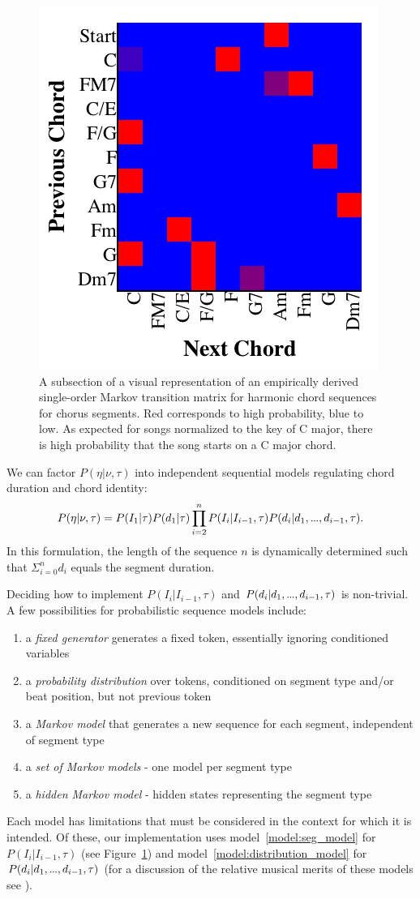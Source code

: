 \documentclass[letterpaper]{article}
\newcommand\mydots{\hbox to .75em{.\hss.\hss.}}
\begin{document}
\begin{figure}[t]
	\centering
	\includegraphics[width=.6\linewidth]{harmony}
	\caption{\label{fig:harmony} A subsection of a visual representation of an empirically derived single-order Markov transition matrix for harmonic chord sequences for chorus segments. Red corresponds to high probability, blue to low. As expected for songs normalized to the key of C major, there is high probability that the song starts on a C major chord. }
\end{figure}

We can factor $P(\eta|\nu,\tau)$ into independent sequential models regulating chord duration and chord identity:
\small
\[ P(\eta|\nu,\tau) = P(I_1|\tau) P(d_1|\tau) \prod_{i=2}^n P(I_i|I_{i-1},\tau) P(d_i | d_1,\mydots,d_{i-1},\tau). \]
\normalsize
\noindent  In this formulation, the length of the sequence $n$ is dynamically determined such that $\Sigma_{i=0}^n d_i$ equals the segment duration.

Deciding how to implement $P(I_i|I_{i-1},\tau)$ and $P(d_i | d_1,\mydots,d_{i-1},\tau)$ is non-trivial. A few possibilities for probabilistic sequence models include:
\begin{enumerate}
\item a \textit{fixed generator} generates a fixed token, essentially ignoring conditioned variables
\item \label{model:distribution_model}a \textit{probability distribution} over tokens, conditioned on segment type and/or beat position, but not previous token
\item a \textit{Markov model} that generates a new sequence for each segment, independent of segment type
\item \label{model:seg_model}a \textit{set of Markov models} - one model per segment type
\item a \textit{hidden Markov model} - hidden states representing the segment type
\end{enumerate}
\noindent Each model has limitations that must be considered in the context for which it is intended. Of these, our implementation uses model~\ref{model:seg_model} for $P(I_i|I_{i-1},\tau)$ (see Figure~\ref{fig:harmony}) and model~\ref{model:distribution_model} for $P(d_i | d_1,\mydots,d_{i-1},\tau)$ (for a discussion of the relative musical merits of these models see \citeauthor{bodily2017Mume} ).
\end{document}
